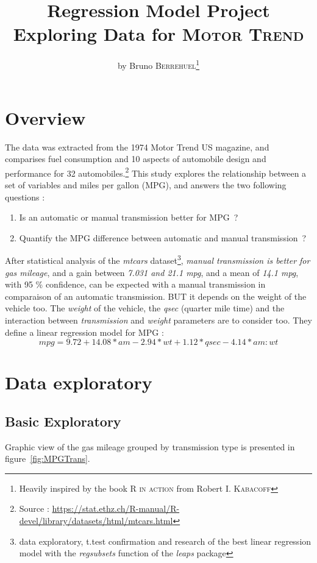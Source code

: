 \documentclass[a4paper, 11pt]{article}\usepackage[]{graphicx}\usepackage[]{color}
\title{Regression Model Project \\ Exploring Data for \textsc{Motor Trend}}
\author{by Bruno \textsc{Berrehuel}\footnote{Heavily inspired by the book \textsc{R in action} from Robert \textsc{I. Kabacoff}}}
\begin{document}
\maketitle

\section{Overview}
The data was extracted from the 1974 Motor Trend US magazine, and comparises fuel consumption and 10 aspects of automobile design and performance for 32 automobiles.\footnote{Source : \url{https://stat.ethz.ch/R-manual/R-devel/library/datasets/html/mtcars.html}}
This study explores the relationship between a set of variables and miles per gallon (MPG), and answers the two following questions :
\begin{enumerate}
    \item Is an automatic or manual transmission better for MPG~?
    \item Quantify the MPG difference between automatic and manual transmission~?
\end{enumerate}

\noindent After statistical analysis of the \emph{mtcars} dataset\footnote{data exploratory, t.test confirmation and research of the best linear regression model with the \emph{regsubsets} function of the \emph{leaps} package}, \emph{manual transmission is better for gas mileage}, and a gain between \emph{7.031 and 21.1 mpg}, and a mean of \emph{14.1 mpg}, with 95 \% confidence, can be expected with a manual transmission in comparaison of an automatic transmission. BUT it depends on the weight of the vehicle too.
The \emph{weight} of the vehicle, the \emph{qsec} (quarter mile time) and the interaction between \emph{transmission} and \emph{weight} parameters are to consider too. They define a linear regression model for MPG :
\begin{displaymath}
    mpg = 9.72 + 14.08*am - 2.94*wt + 1.12*qsec - 4.14*am:wt
\end{displaymath}

\section{Data exploratory}
\subsection{Basic Exploratory}
Graphic view of the gas mileage grouped by transmission type is presented in figure~\ref{fig:MPGTrans}.
\end{document}
